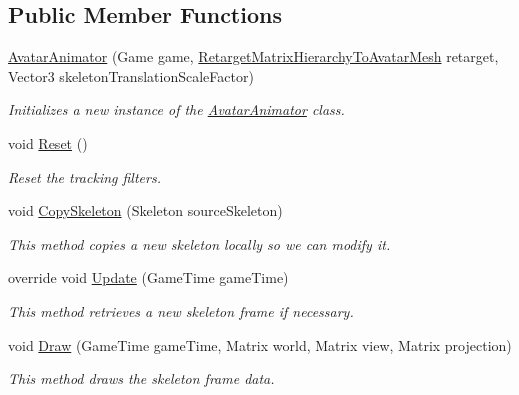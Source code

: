 \subsection*{Public Member Functions}
\begin{DoxyCompactItemize}
\item 
\hyperlink{class_microsoft_1_1_samples_1_1_kinect_1_1_avateering_1_1_avatar_animator_a867e1504135b023647dcfe7ccfa8346b}{Avatar\+Animator} (Game game, \hyperlink{namespace_microsoft_1_1_samples_1_1_kinect_1_1_avateering_a2c91e120476e4f1ece17c53d41ff8327}{Retarget\+Matrix\+Hierarchy\+To\+Avatar\+Mesh} retarget, Vector3 skeleton\+Translation\+Scale\+Factor)
\begin{DoxyCompactList}\small\item\em Initializes a new instance of the \hyperlink{class_microsoft_1_1_samples_1_1_kinect_1_1_avateering_1_1_avatar_animator}{Avatar\+Animator} class. \end{DoxyCompactList}\item 
void \hyperlink{class_microsoft_1_1_samples_1_1_kinect_1_1_avateering_1_1_avatar_animator_ad1d121e16db910507be5d999cd6b0408}{Reset} ()
\begin{DoxyCompactList}\small\item\em Reset the tracking filters. \end{DoxyCompactList}\item 
void \hyperlink{class_microsoft_1_1_samples_1_1_kinect_1_1_avateering_1_1_avatar_animator_adb8495bec1c5f70a396db72d94eee599}{Copy\+Skeleton} (Skeleton source\+Skeleton)
\begin{DoxyCompactList}\small\item\em This method copies a new skeleton locally so we can modify it. \end{DoxyCompactList}\item 
override void \hyperlink{class_microsoft_1_1_samples_1_1_kinect_1_1_avateering_1_1_avatar_animator_a46df6cf97a78c7ade81427b77cab321e}{Update} (Game\+Time game\+Time)
\begin{DoxyCompactList}\small\item\em This method retrieves a new skeleton frame if necessary. \end{DoxyCompactList}\item 
void \hyperlink{class_microsoft_1_1_samples_1_1_kinect_1_1_avateering_1_1_avatar_animator_a310a799c7fe1e687ddc27f3b02f1d354}{Draw} (Game\+Time game\+Time, Matrix world, Matrix view, Matrix projection)
\begin{DoxyCompactList}\small\item\em This method draws the skeleton frame data. \end{DoxyCompactList}\end{DoxyCompactItemize}
